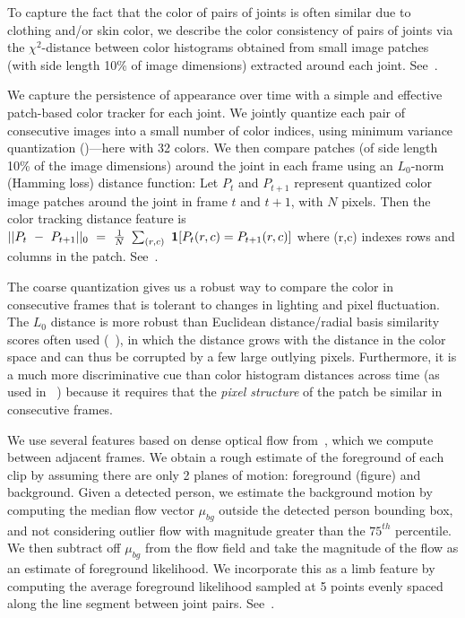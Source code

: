 To capture the fact that the color of pairs of 
joints is often similar due to clothing and/or skin color, we describe the 
color consistency of pairs of joints via the $\chi^2$-distance between color 
histograms obtained from small image patches (with side length 10\% of image 
dimensions) extracted around each joint.  See~.

  We capture the persistence of appearance over 
time with a simple and effective patch-based color tracker for each joint.  We 
jointly quantize each pair of consecutive images into a small number of color 
indices, using minimum variance quantization ()---here with 32 
colors.  We then compare patches (of side length 10\% of the image dimensions) 
around the joint in each frame using an $L_0$-norm (Hamming loss) distance 
function:  Let $P_{t}$ and $P_{t+1}$ represent quantized color image patches 
around the joint in frame $t$ and $t+1$, with $N$ pixels.  Then the color 
tracking distance feature is $ 
||P_t~-~P_{t+1}||_0~=~\frac{1}{N}~\sum_{(r,c)}~\mathbf{1}[P_{t}(r,c)=P_{t+1}(r,c)]$ 
where (r,c) indexes rows and columns in the patch.  
See~.

The coarse quantization gives us a robust way to compare the color in 
consecutive frames that is tolerant to changes in lighting and pixel 
fluctuation.  The $L_0$ distance is more robust than Euclidean distance/radial 
basis similarity scores often used (\eg~\citet{gould08ijcv}), in which the 
distance grows with the distance in the color space and can thus be corrupted 
by a few large outlying pixels.  Furthermore, it is a much more discriminative 
cue than color histogram distances across time (as used in \eg~\citet{ren07}) 
because it requires that the {\em pixel structure} of the patch be similar in 
consecutive frames.  

We use several features based on dense optical flow from~\cite{optflow}, which we compute between 
adjacent frames. We obtain a rough estimate of the foreground of each clip by 
assuming there are only 2 planes of motion: foreground (figure) and background.  
Given a detected person, we estimate the background motion by computing the 
median flow vector $\mu_{bg}$ outside the detected person bounding box, and not 
considering outlier flow with magnitude greater than the $75^{th}$ percentile.  
We then subtract off $\mu_{bg}$ from the flow field and take the magnitude of 
the flow as an estimate of foreground likelihood.  We incorporate this as a
limb feature by computing the average foreground likelihood sampled at 5 points 
evenly spaced along the line segment between joint pairs.
See~.

